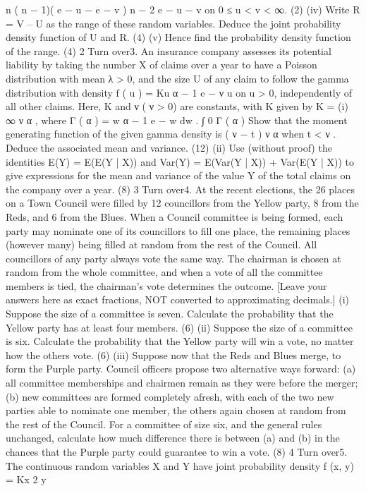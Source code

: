 n ( n − 1)( e − u − e − v ) n − 2 e − u − v on 0 ≤ u < v < ∞.
(2)
(iv) Write R = V – U as the range of these random variables. Deduce the joint
probability density function of U and R.
(4)
(v) Hence find the probability density function of the range.
(4)
2
Turn over3.
An insurance company assesses its potential liability by taking the number X of claims
over a year to have a Poisson distribution with mean λ > 0, and the size U of any
claim to follow the gamma distribution with density f ( u ) = Ku α − 1 e − ν u on u > 0,
independently of all other claims. Here, K and ν ( ν > 0) are constants, with K given
by K =
(i)
∞
ν α
, where Γ ( α ) =
w α − 1 e − w dw .
∫
0
Γ ( α )
Show that the moment generating function of the given gamma density is
( ν − t )
ν
α
when t < ν . Deduce the associated mean and variance.
(12)
(ii)
Use (without proof) the identities
E(Y) = E(E(Y | X)) and Var(Y) = E(Var(Y | X)) + Var(E(Y | X))
to give expressions for the mean and variance of the value Y of the total claims
on the company over a year.
(8)
3
Turn over4.
At the recent elections, the 26 places on a Town Council were filled by 12 councillors
from the Yellow party, 8 from the Reds, and 6 from the Blues. When a Council
committee is being formed, each party may nominate one of its councillors to fill one
place, the remaining places (however many) being filled at random from the rest of the
Council. All councillors of any party always vote the same way. The chairman is
chosen at random from the whole committee, and when a vote of all the committee
members is tied, the chairman’s vote determines the outcome.
[Leave your answers here as exact fractions, NOT converted to approximating
decimals.]
(i) Suppose the size of a committee is seven. Calculate the probability that the
Yellow party has at least four members.
(6)
(ii) Suppose the size of a committee is six. Calculate the probability that the
Yellow party will win a vote, no matter how the others vote.
(6)
(iii) Suppose now that the Reds and Blues merge, to form the Purple party. Council
officers propose two alternative ways forward:
(a) all committee memberships and chairmen remain as they were before
the merger;
(b) new committees are formed completely afresh, with each of the two
new parties able to nominate one member, the others again chosen at
random from the rest of the Council.
For a committee of size six, and the general rules unchanged, calculate how
much difference there is between (a) and (b) in the chances that the Purple
party could guarantee to win a vote.
(8)
4
Turn over5.
The continuous random variables X and Y have joint probability density f (x, y) = Kx 2 y
